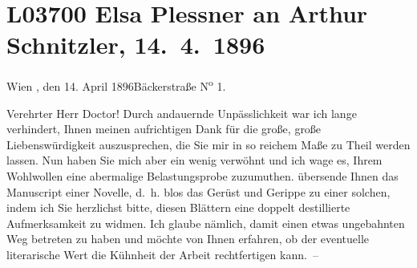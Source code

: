 

\section[Elsa Plessner an Arthur Schnitzler, 14. 4. 1896]{L03700 Elsa Plessner an Arthur Schnitzler, 14. 4. 1896}
\nopagebreak{}
\rehead{ }\normalsize\beginnumbering{}
\toendnotes[C]{\smallbreak\pagebreak[2]}
\toendnotes[C]{\smallbreak}
\pstart
           {\pb}Wien , den 14. April 1896\hfill Bäckerstraße N\textsuperscript{o}
                        1.\pend
           
\pstart{}Verehrter Herr Doctor!\pend\vspace{0.5em}
\pstart
           Durch andauernde Unpässlichkeit war ich lange verhindert, Ihnen meinen aufrichtigen
               Dank für die große, große Liebenswürdigkeit auszusprechen, die Sie mir in so reichem
               Maße zu Theil werden lassen. Nun haben Sie mich aber ein wenig verwöhnt und ich wage
               es, Ihrem Wohlwollen eine abermalige Belastungsprobe zuzumuthen. \label{K_L03700-1v}\label{K_L03700-1} übersende Ihnen das Manuscript einer Novelle, d. h. blos das Gerüst
               und Gerippe zu einer solchen, indem ich Sie herzlichst bitte, diesen Blättern eine
               doppelt destillierte Aufmerksamkeit zu widmen. Ich glaube nämlich, damit einen etwas
               ungebahnten Weg betreten zu haben und möchte von Ihnen erfahren, ob der eventuelle
               literarische Wert die Kühnheit der Arbeit rechtfertigen kann. –\pend
           
